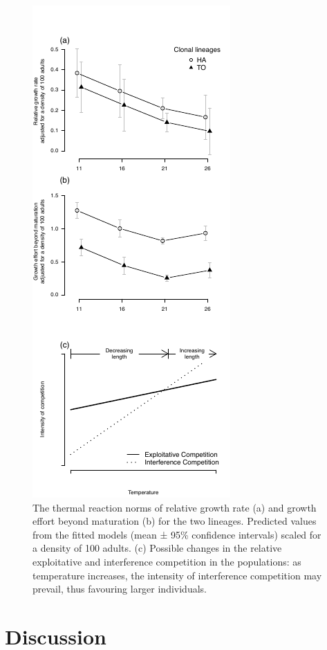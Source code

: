 \begin{figure}[!ht] %
\centering
\includegraphics[height=0.8\textheight]{5_ChapExp3/fig/Fig5} 
\caption[Thermal reaction norms of relative
growth rate and GEBM]{ The thermal reaction norms of relative growth rate (a)
and growth effort beyond maturation (b) for the two lineages. Predicted values from the fitted models
(mean ± 95\% confidence intervals) scaled for a density of 100 adults. (c)
Possible changes in the relative exploitative and interference competition in
the populations: as temperature increases, the intensity of interference
competition may prevail, thus favouring larger individuals.}
\label{Fig5-5}
\end{figure}

\section{Discussion}

